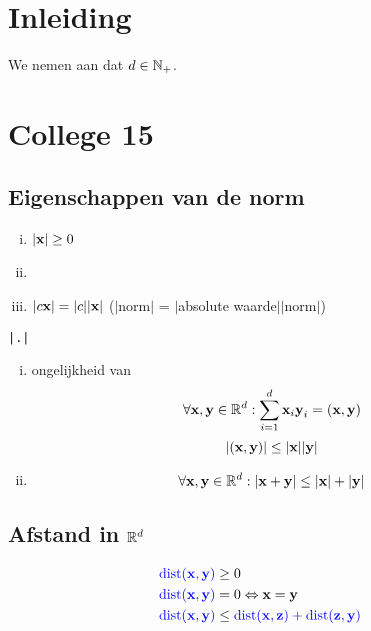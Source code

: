 \documentclass{2wa40summary}
\begin{document}
\section{Inleiding}
We nemen aan dat $d\in\mathbb{N}_+$.

\section{College 15}
    \subsection{Eigenschappen van de norm}
    \begin{enumerate}[(i)]
      \item $|{\textbf{x}}| \geq 0$
      \item \blu{$\abs{\x}=0 \Leftrightarrow \x=\zero$}
      \item $|c{\textbf{x}}|=|c||{\textbf{x}}|$ ($|$norm$|$ = $|$absolute waarde$||$norm$|$)
    \end{enumerate}
 \verb#|.|# 
    \begin{enumerate}[(i)]
      \item ongelijkheid van 
        \[\forall {\textbf{x}},{\textbf{y}} \in \mathbb{R}^d: \sum_{i=1}^{d}{\textbf{x}}_i {\textbf{y}}_i = ({\textbf{x}},{\textbf{y}})\]
        \[|({\textbf{x}},{\textbf{y}})| \leq |{\textbf{x}}||{\textbf{y}}|\]
      \item {}
        \[\forall {\textbf{x}},{\textbf{y}} \in \mathbb{R}^d: |{\textbf{x}}+{\textbf{y}}|\leq |{\textbf{x}}|+|{\textbf{y}}|\]
    \end{enumerate}
\subsection{Afstand in $\mathbb{R}^d$}
\begin{define}
            \begin{align*}
              {\color{blue}\operatorname{\mathop{dist}}({\textbf{x}},{\textbf{y}})} & \geq 0 \\
              {\color{blue}\operatorname{\mathop{dist}}({\textbf{x}},{\textbf{y}})} & =0 \Leftrightarrow {\textbf{x}}={\textbf{y}} \\
              {\color{blue}\operatorname{\mathop{dist}}({\textbf{x}},{\textbf{y}})} & \leq {\color{blue}\operatorname{\mathop{dist}}({\textbf{x}},{\textbf{z}}) + \operatorname{\mathop{dist}}({\textbf{z}},{\textbf{y}})}
            \end{align*}
\end{define}
\end{document}
